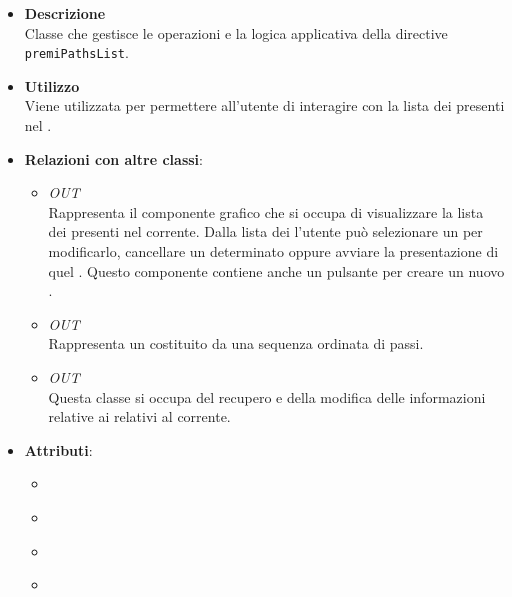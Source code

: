 \FloatBarrier
\begin{itemize}
\item \textbf{Descrizione}\\
Classe che gestisce le operazioni e la logica applicativa della directive \texttt{premiPathsList}.
\item \textbf{Utilizzo}\\
Viene utilizzata per permettere all'utente di interagire con la lista dei  presenti nel .
\item \textbf{Relazioni con altre classi}:
\begin{itemize}
\item \textit{OUT} \hyperref[\nogloxy{Premi::Front-End::Directives::premiPathsList}]{}\\
Rappresenta il componente grafico che si occupa di visualizzare la lista dei  presenti nel  corrente. Dalla lista dei  l'utente può selezionare un  per modificarlo, cancellare un determinato  oppure avviare la presentazione di quel . Questo componente contiene anche un pulsante per creare un nuovo .
\item \textit{OUT} \hyperref[\nogloxy{Premi::Front-End::Model::Path}]{}\\
Rappresenta un  costituito da una sequenza ordinata di passi.
\item \textit{OUT} \hyperref[\nogloxy{Premi::Front-End::Services::PathService}]{}\\
Questa classe si occupa del recupero e della modifica delle informazioni relative ai  relativi al  corrente.
\end{itemize}
\item \textbf{Attributi}:
\begin{itemize}
\item {}
\\ \dpPathServiceField
\item {}
\\ \dpLocationField
\item {}
\\ \dpMDDialogServiceField
\item {}

\end{itemize}
\end{itemize}
